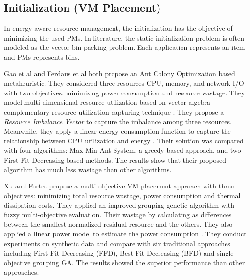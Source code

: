 \subsection{Initialization (VM Placement)}
In energy-aware resource management, the initialization has the objective of minimizing the used PMs. In literature, the static initialization problem is often modeled as the vector bin packing problem. Each application represents an item and PMs represents bins.


Gao et al \cite{Gao:2013gg} and Ferdaus et al \cite{Ferdaus:2014ep} both propose an Ant Colony Optimization based metaheuristic. They considered three resources CPU, memory, and network I/O with two objectives: minimizing power consumption and resource wastage. They model multi-dimensional resource utilization based on vector algebra complementary resource utilization capturing technique \cite{Mishra:2011bz}. They propose a \emph{Resource Imbalance Vector} to capture the imbalance among three resources. Meanwhile, they apply a linear energy consumption function to capture the relationship between CPU utilization and energy \cite{Fan:2007jr}. Their solution was compared with four algorithms: Max-Min Ant System, a greedy-based approach, and two First Fit Decreasing-based methods. The results show that their proposed algorithm has much less wastage than other algorithms.

Xu and Fortes \cite{Xu:2010df} propose a multi-objective VM placement approach with three objectives: minimizing total resource wastage, power consumption and thermal dissipation costs. They applied an improved grouping genetic algorithm with fuzzy multi-objective evaluation. Their wastage by calculating as differences between the smallest normalized residual resource and the others. They also applied a linear power model to estimate the power consumption \cite{Lien:2007it}.  They conduct experiments on synthetic data and compare with six traditional approaches including First Fit Decreasing (FFD), Best Fit Decreasing (BFD) and single-objective grouping GA. The results showed the superior performance than other approaches. 



